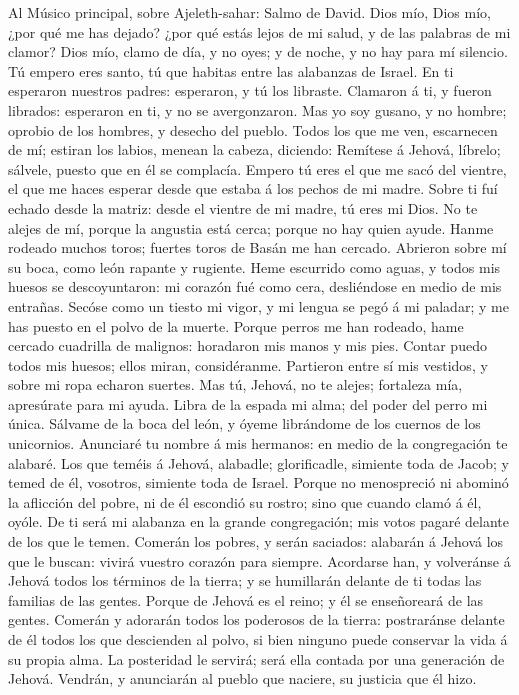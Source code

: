  Al Músico principal, sobre Ajeleth-sahar: Salmo de David.
Dios mío, Dios mío, ¿por qué me has dejado? ¿por qué estás lejos de mi
salud, y de las palabras de mi clamor?  Dios mío, clamo de
día, y no oyes; y de noche, y no hay para mí silencio.  Tú
empero eres santo, tú que habitas entre las alabanzas de Israel.
 En ti esperaron nuestros padres: esperaron, y tú los
libraste.  Clamaron á ti, y fueron librados: esperaron en
ti, y no se avergonzaron.  Mas yo soy gusano, y no hombre;
oprobio de los hombres, y desecho del pueblo.  Todos los
que me ven, escarnecen de mí; estiran los labios, menean la cabeza,
diciendo:  Remítese á Jehová, líbrelo; sálvele, puesto que
en él se complacía.  Empero tú eres el que me sacó del
vientre, el que me haces esperar desde que estaba á los pechos de mi
madre.  Sobre ti fuí echado desde la matriz: desde el
vientre de mi madre, tú eres mi Dios.  No te alejes de
mí, porque la angustia está cerca; porque no hay quien ayude.
 Hanme rodeado muchos toros; fuertes toros de Basán me
han cercado.  Abrieron sobre mí su boca, como león
rapante y rugiente.  Heme escurrido como aguas, y todos
mis huesos se descoyuntaron: mi corazón fué como cera, desliéndose en
medio de mis entrañas.  Secóse como un tiesto mi vigor, y
mi lengua se pegó á mi paladar; y me has puesto en el polvo de la
muerte.  Porque perros me han rodeado, hame cercado
cuadrilla de malignos: horadaron mis manos y mis pies. 
Contar puedo todos mis huesos; ellos miran, considéranme.
 Partieron entre sí mis vestidos, y sobre mi ropa echaron
suertes.  Mas tú, Jehová, no te alejes; fortaleza mía,
apresúrate para mi ayuda.  Libra de la espada mi alma;
del poder del perro mi única.  Sálvame de la boca del
león, y óyeme librándome de los cuernos de los unicornios.
 Anunciaré tu nombre á mis hermanos: en medio de la
congregación te alabaré.  Los que teméis á Jehová,
alabadle; glorificadle, simiente toda de Jacob; y temed de él, vosotros,
simiente toda de Israel.  Porque no menospreció ni
abominó la aflicción del pobre, ni de él escondió su rostro; sino que
cuando clamó á él, oyóle.  De ti será mi alabanza en la
grande congregación; mis votos pagaré delante de los que le temen.
 Comerán los pobres, y serán saciados: alabarán á Jehová
los que le buscan: vivirá vuestro corazón para siempre. 
Acordarse han, y volveránse á Jehová todos los términos de la tierra; y
se humillarán delante de ti todas las familias de las gentes.
 Porque de Jehová es el reino; y él se enseñoreará de las
gentes.  Comerán y adorarán todos los poderosos de la
tierra: postraránse delante de él todos los que descienden al polvo, si
bien ninguno puede conservar la vida á su propia alma. 
La posteridad le servirá; será ella contada por una generación de
Jehová.  Vendrán, y anunciarán al pueblo que naciere, su
justicia que él hizo.

